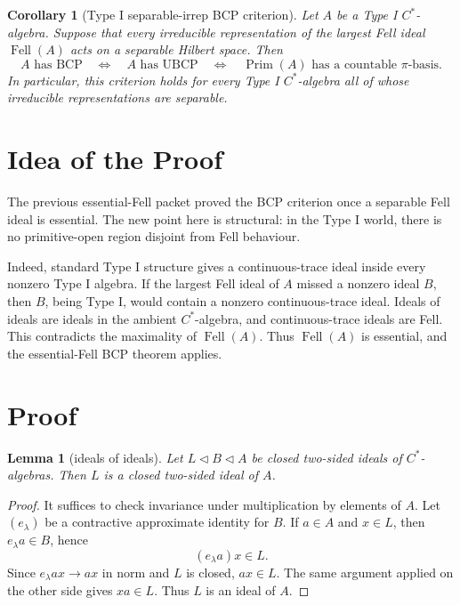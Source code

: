 \documentclass[11pt]{article}
\newtheorem{lemma}{Lemma}
\newtheorem{corollary}{Corollary}
\newcommand{\Prim}{\operatorname{Prim}}
\newcommand{\Fell}{\operatorname{Fell}}
\begin{document}
\begin{corollary}[Type I separable-irrep BCP criterion]
\label{cor:typei}
Let \(A\) be a Type I \(C^*\)-algebra.  Suppose that every irreducible
representation of the largest Fell ideal \(\Fell(A)\) acts on a separable
Hilbert space.  Then
\[
        A\text{ has BCP}
        \quad\Longleftrightarrow\quad
        A\text{ has UBCP}
        \quad\Longleftrightarrow\quad
        \Prim(A)\text{ has a countable }\pi\text{-basis}.
\]
In particular, this criterion holds for every Type I \(C^*\)-algebra all of
whose irreducible representations are separable.
\end{corollary}

\section*{Idea of the Proof}

The previous essential-Fell packet proved the BCP criterion once a separable
Fell ideal is essential.  The new point here is structural: in the Type I
world, there is no primitive-open region disjoint from Fell behaviour.

Indeed, standard Type I structure gives a continuous-trace ideal inside every
nonzero Type I algebra.  If the largest Fell ideal of \(A\) missed a nonzero
ideal \(B\), then \(B\), being Type I, would contain a nonzero
continuous-trace ideal.  Ideals of ideals are ideals in the ambient
\(C^*\)-algebra, and continuous-trace ideals are Fell.  This contradicts the
maximality of \(\Fell(A)\).  Thus \(\Fell(A)\) is essential, and the
essential-Fell BCP theorem applies.

\section*{Proof}

\begin{lemma}[ideals of ideals]
\label{lem:ideal-of-ideal}
Let \(L\triangleleft B\triangleleft A\) be closed two-sided ideals of
\(C^*\)-algebras.  Then \(L\) is a closed two-sided ideal of \(A\).
\end{lemma}

\begin{proof}
It suffices to check invariance under multiplication by elements of \(A\).
Let \((e_\lambda)\) be a contractive approximate identity for \(B\).  If
\(a\in A\) and \(x\in L\), then \(e_\lambda a\in B\), hence
\[
        (e_\lambda a)x\in L.
\]
Since \(e_\lambda a x\to ax\) in norm and \(L\) is closed, \(ax\in L\).  The
same argument applied on the other side gives \(xa\in L\).  Thus \(L\) is an
ideal of \(A\).
\end{proof}
\end{document}
